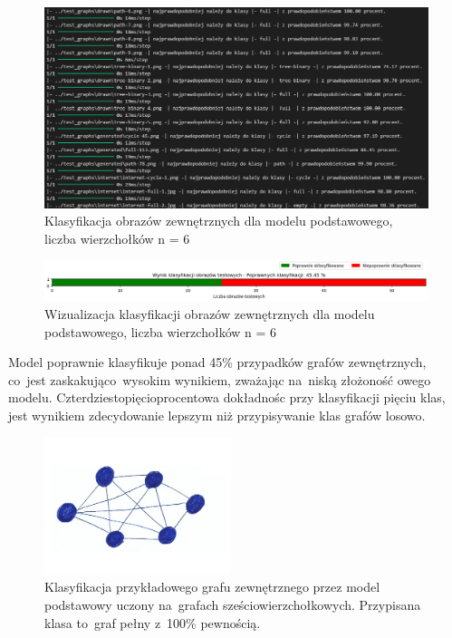 \begin{figure}[ht]
	\centering
	\includegraphics[width=15.5cm]{resources/tests/images/v3/base6_txt.png}
	\caption{Klasyfikacja obrazów zewnętrznych dla modelu podstawowego, liczba wierzchołków n = 6}
	\label{Fig:tests-base-3b}
\end{figure}
\FloatBarrier

\begin{figure}[ht]
	\centering
	\includegraphics[width=15.5cm]{resources/tests/images/v3/base6_bar.png}
	\caption{Wizualizacja klasyfikacji obrazów zewnętrznych dla modelu podstawowego, liczba wierzchołków n = 6}
	\label{Fig:tests-base-3c}
\end{figure}
\FloatBarrier

Model poprawnie klasyfikuje ponad 45\% przypadków grafów zewnętrznych,
co~jest zaskakująco~wysokim wynikiem, zważając na~niską złożoność owego modelu.
Czterdziestopięcioprocentowa dokładnośc przy klasyfikacji pięciu klas,
jest wynikiem zdecydowanie lepszym niż przypisywanie klas grafów losowo.

\begin{figure}[ht]
	\centering
	\includegraphics[height=4cm]{../graph_classification/test_graphs/drawn/full-9.png}
	\caption{Klasyfikacja przykładowego grafu zewnętrznego przez model podstawowy uczony na~grafach sześciowierzchołkowych.
		Przypisana klasa to~graf pełny z~100\% pewnością.}
	\label{Fig:tests-base-3d}
\end{figure}
\FloatBarrier


